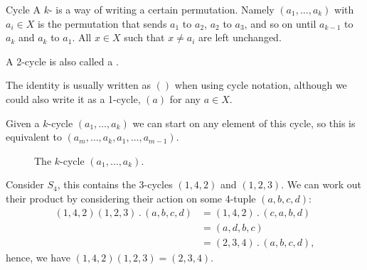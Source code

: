 \documentclass[fleqn]{NotesClass}
\newcommand*{\action}{\mathbin{.}}
\begin{document}
    \begin{dfn}{Cycle}{}
        A \(k\)- is a way of writing a certain permutation.
        Namely \((a_1, \dotsc, a_k)\) with \(a_i \in X\) is the permutation that sends \(a_1\) to \(a_2\), \(a_2\) to \(a_3\), and so on until \(a_{k-1}\) to \(a_k\) and \(a_k\) to \(a_1\).
        All \(x \in X\) such that \(x \ne a_i\) are left unchanged.
        
        A 2-cycle is also called a .
        
        The identity is usually written as \(()\) when using cycle notation, although we could also write it as a 1-cycle, \((a)\) for any \(a \in X\).
        
        Given a \(k\)-cycle \((a_1, \dotsc, a_k)\) we can start on any element of this cycle, so this is equivalent to \((a_m, \dotsc, a_k, a_1, \dotsc, a_{m-1})\).
    \end{dfn}
    
    \begin{figure}
        \caption{The \(k\)-cycle \((a_1, \dotsc, a_k)\).}
    \end{figure}
    
    \begin{exm}{}{}
        Consider \(S_4\), this contains the 3-cycles \((1, 4, 2)\) and \((1, 2, 3)\).
        We can work out their product by considering their action on some 4-tuple \((a, b, c, d)\):
        \begin{align}
            (1, 4, 2)(1, 2, 3) \action (a, b, c, d) &= (1, 4, 2) \action (c, a, b, d)\\
            &= (a, d, b, c)\\
            &= (2, 3, 4) \action (a, b, c, d),
        \end{align}
        hence, we have \((1, 4, 2) (1, 2, 3) = (2, 3, 4)\).
    \end{exm}
    
\end{document}
